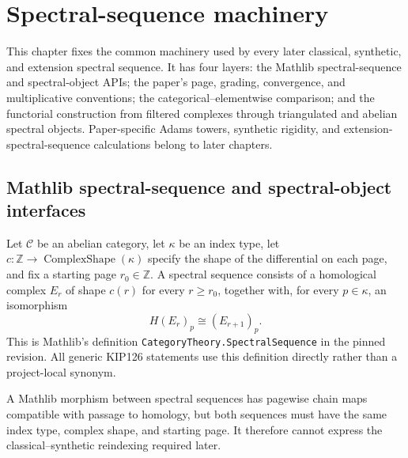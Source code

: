 \chapter{Spectral-sequence machinery}
\label{chap:spectral-sequence-machinery}

This chapter fixes the common machinery used by every later classical,
synthetic, and extension spectral sequence.  It has four layers: the Mathlib
spectral-sequence and spectral-object APIs; the paper's page, grading,
convergence, and multiplicative conventions; the categorical--elementwise
comparison; and the functorial construction from filtered complexes through
triangulated and abelian spectral objects.  Paper-specific Adams towers,
synthetic rigidity, and extension-spectral-sequence calculations belong to
later chapters.

\section{Mathlib spectral-sequence and spectral-object interfaces}

\begin{definition}
  \label{def:mathlib-spectral-sequence}
  \mathlibok
  Let $\mathcal C$ be an abelian category, let $\kappa$ be an index type, let
  $c : \mathbb Z \to \operatorname{ComplexShape}(\kappa)$ specify the shape
  of the differential on each page, and fix a starting page $r_0\in\mathbb Z$.
  A spectral sequence consists of a homological complex $E_r$ of shape $c(r)$
  for every $r\ge r_0$, together with, for every $p\in\kappa$, an isomorphism
  \[
    H(E_r)_p \cong (E_{r+1})_p.
  \]
  This is Mathlib's definition \texttt{CategoryTheory.SpectralSequence} in
  the pinned revision.  All generic KIP126 statements use this definition
  directly rather than a project-local synonym.
\end{definition}

\begin{definition}
  \label{def:mathlib-spectral-sequence-hom}
  \mathlibok
  A Mathlib morphism between spectral sequences has pagewise chain maps
  compatible with passage to homology, but both sequences must have the same
  index type, complex shape, and starting page.  It therefore cannot express
  the classical--synthetic reindexing required later.
\end{definition}

